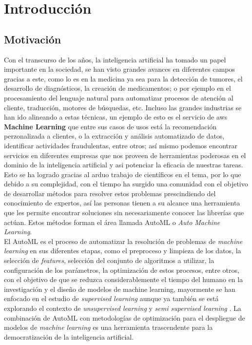 \chapter*{Introducción}\label{chapter:introduction}

\section*{Motivación}
Con el transcurso de los años, la inteligencia artificial ha tomado un papel importante en la sociedad, se han visto grandes avances en diferentes campos gracias a este, como lo es en la medicina ya sea para la detección de tumores, el desarrollo de diagnósticos, la creación de medicamentos; o por ejemplo en el procesamiento del lenguaje natural para automatizar procesos de atención al cliente, traducción, motores de búsquedas, etc. Incluso las grandes industrias se han ido alineando a estas técnicas, un ejemplo de esto es el servicio de aws \textbf{Machine Learning} que entre sus casos de usos está la recomendación perzonalizada a clientes, o la extracción y análisis automatizado de datos, identificar actividades fraudulentas, entre otros; así mismo podemos encontrar servicios en diferentes empresas que nos proveen de herramientas poderosas en el dominio de la inteligencia artificial y asi potenciar la eficacia de nuestras tareas. Esto se ha logrado gracias al arduo trabajo de científicos en el tema, por lo que debido a su complejidad, con el tiempo ha surgido una comunidad con el objetivo de desarrollar métodos para resolver estos problemas prescindiendo del conocimiento de expertos, así las personas tienen a su alcance una herramienta que les permite encontrar soluciones sin necesariamente conocer las librerías que actúan. Estos métodos forman el área llamada AutoML o \textit{Auto Machine Learning}.\\

El AutoML es el proceso de automatizar la resolución de problemas de \textit{machine learning} en sus diferentes etapas, como el preproceso y limpieza de los datos, la selección de \textit{features}, selección del conjunto de algoritmos a utilizar, la configuración de los parámetros, la optimización de estos procesos, entre otros, con el objetivo de que se reduzca considerablemente el tiempo del humano en la investigación y el diseño de modelos de machine learning, mayormente se han enfocado en el estudio de \textit{supervised learning} aunque ya también se está explorando el contexto de \textit{unsupervised learning} \parencite{1} y \textit{semi supervised learning} \parencite{2}. La combinación de AutoML con metodologías de optimización para el despliegue de modelos de \textit{machine learning} es una herramienta trascendente para la democratización de la inteligencia artificial.\\

